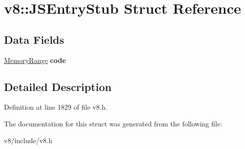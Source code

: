 \hypertarget{structv8_1_1JSEntryStub}{}\section{v8\+:\+:J\+S\+Entry\+Stub Struct Reference}
\label{structv8_1_1JSEntryStub}
\subsection*{Data Fields}
\begin{DoxyCompactItemize}
\item 
\mbox{\label{structv8_1_1JSEntryStub_a86cf44d2ee29d523a33a0f2f2fe407d0}} 
\mbox{\hyperlink{structv8_1_1MemoryRange}{Memory\+Range}} {\bfseries code}
\end{DoxyCompactItemize}


\subsection{Detailed Description}


Definition at line 1829 of file v8.\+h.



The documentation for this struct was generated from the following file\+:\begin{DoxyCompactItemize}
\item 
v8/include/v8.\+h\end{DoxyCompactItemize}
